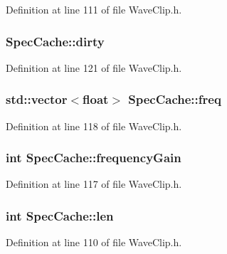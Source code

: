 Definition at line 111 of file Wave\+Clip.\+h.

\subsubsection[{\texorpdfstring{dirty}{dirty}}]{ Spec\+Cache\+::dirty}\hypertarget{class_spec_cache_a573ba0d72fec427aa63647ec7054b3b9}{}\label{class_spec_cache_a573ba0d72fec427aa63647ec7054b3b9}


Definition at line 121 of file Wave\+Clip.\+h.

\subsubsection[{\texorpdfstring{freq}{freq}}]{\setlength{\rightskip}{0pt plus 5cm}std\+::vector$<$float$>$ Spec\+Cache\+::freq}\hypertarget{class_spec_cache_ad51fc14ddf41540e51b9c4f458218bfc}{}\label{class_spec_cache_ad51fc14ddf41540e51b9c4f458218bfc}


Definition at line 118 of file Wave\+Clip.\+h.

\subsubsection[{\texorpdfstring{frequency\+Gain}{frequencyGain}}]{ {\bf int} Spec\+Cache\+::frequency\+Gain}\hypertarget{class_spec_cache_aec9115975c7d2202f82492b672040958}{}\label{class_spec_cache_aec9115975c7d2202f82492b672040958}


Definition at line 117 of file Wave\+Clip.\+h.

\subsubsection[{\texorpdfstring{len}{len}}]{ {\bf int} Spec\+Cache\+::len}\hypertarget{class_spec_cache_a53e9ba2a9e456d336fc9caac806b3f3c}{}\label{class_spec_cache_a53e9ba2a9e456d336fc9caac806b3f3c}


Definition at line 110 of file Wave\+Clip.\+h.


